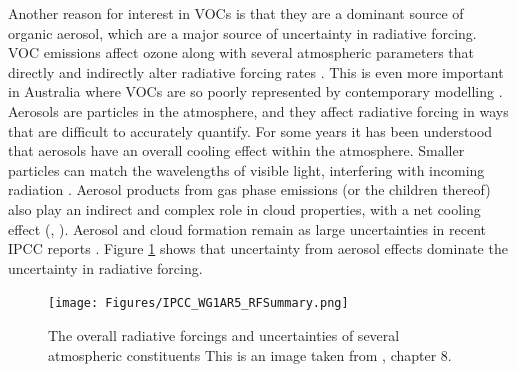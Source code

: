     Another reason for interest in VOCs is that they are a dominant source of 
    organic aerosol, which are a major source of uncertainty in radiative 
    forcing.
    VOC emissions affect ozone along with several atmospheric parameters that 
    directly and indirectly alter radiative forcing rates 
    \parencite[e.g.,][]{Arneth2008}.
    This is even more important in Australia where VOCs are so poorly 
    represented by contemporary modelling \parencite{Emmerson2016}.
    Aerosols are particles in the atmosphere, and they affect radiative forcing 
    in ways that are difficult to accurately quantify.
    For some years it has been understood that aerosols have an overall cooling 
    effect within the atmosphere.
    Smaller particles can match the wavelengths of visible light, interfering 
    with incoming radiation \parencite{Kanakidou2005}.
    Aerosol products from gas phase emissions (or the children thereof) also 
    play an indirect and complex role in cloud properties, with a net cooling 
    effect (\textcite{Kanakidou2005}, \textcite[Chapter 7, 8]{IPCC_AR5_WG1}).
    Aerosol and cloud formation remain as large uncertainties in recent IPCC 
    reports \parencite{IPCC_Chapter2}.
    Figure \ref{LR:VOCs:IsopCascade:RF:fig_IPCC_RF_AR5} shows that uncertainty 
    from aerosol effects dominate the uncertainty in radiative forcing.
    
    
    \begin{figure}
      \texttt{[image: Figures/IPCC\_WG1AR5\_RFSummary.png]}
      \caption{%
        The overall radiative forcings and uncertainties of several atmospheric 
        constituents
        This is an image taken from \textcite{IPCC_AR5_WG1}, chapter 8.}
      \label{LR:VOCs:IsopCascade:RF:fig_IPCC_RF_AR5}
    \end{figure}    
    
